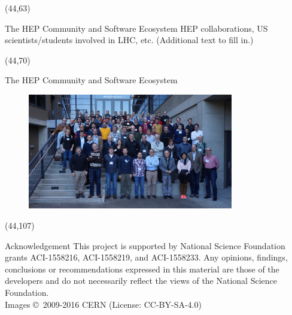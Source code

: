 \documentclass[final]{beamer}
\begin{document}
\begin{frame}{}
\begin{textblock}{38.0}(44,63)
\begin{block}{The HEP Community and Software Ecosystem}
HEP collaborations, US scientists/students involved in LHC, etc. (Additional text to fill in.)
\end{block}
\end{textblock}


\begin{textblock}{38.0}(44,70)
\begin{block}{The HEP Community and Software Ecosystem}
\begin{figure}[tbph]
\centering
\includegraphics[width=0.80\textwidth]{images/20170125-HSF-SDSC-Workshop-group-photo.jpg}
\end{figure}
\end{block}
\end{textblock}













\begin{textblock}{38.0}(44,107)
\begin{block}{Acknowledgement}
This project is supported by National Science Foundation grants ACI-1558216, ACI-1558219, and ACI-1558233. Any opinions, findings, conclusions or recommendations expressed in this material are those of the developers and do not necessarily reflect the views of the National Science Foundation. \\
Images \copyright~2009-2016 CERN (License: CC-BY-SA-4.0)

\end{block}
\end{textblock}




\end{frame}
\end{document}
